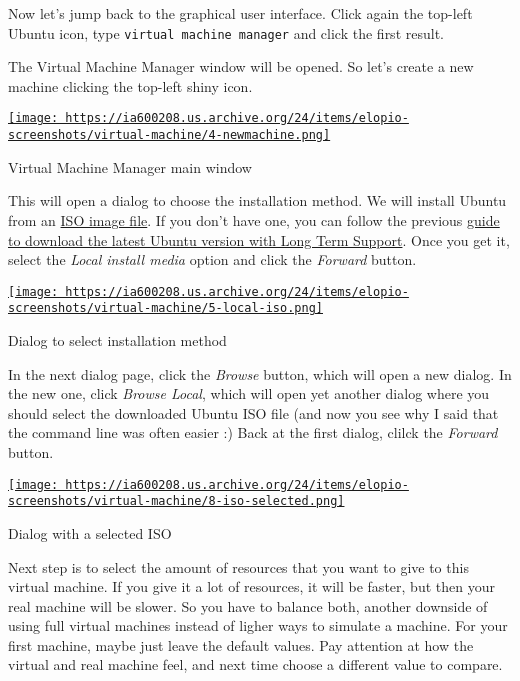 \documentclass[12pt]{article}
\begin{document}
Now let's jump back to the graphical user interface. Click again the top-left
Ubuntu icon, type \verb$virtual machine manager$ and click the first result.

The Virtual Machine Manager window will be opened. So let's create a new machine
clicking the top-left shiny icon.

\begin{center}
  \href{
    https://ia600208.us.archive.org/24/items/elopio-screenshots/virtual-machine/4-newmachine.png}{
    \texttt{[image: 
    https://ia600208.us.archive.org/24/items/elopio-screenshots/virtual-machine/4-newmachine.png]}
  }
  \caption{Virtual Machine Manager main window}
\end{center}

This will open a dialog to choose the installation method. We will install
Ubuntu from an
\href{https://en.wikipedia.org/wiki/ISO_image}{ISO image file}. If you don't
have one, you can follow the previous
\href{http://elopio.net/blog/download-ubuntu/}
     {guide to download the latest Ubuntu version with Long Term Support}.
Once you get it, select the \emph{Local install media} option and click the
\emph{Forward} button.

\begin{center}
  \href{
    https://ia600208.us.archive.org/24/items/elopio-screenshots/virtual-machine/5-local-iso.png}{
    \texttt{[image: 
    https://ia600208.us.archive.org/24/items/elopio-screenshots/virtual-machine/5-local-iso.png]}
  }
  \caption{Dialog to select installation method}
\end{center}

In the next dialog page, click the \emph{Browse} button, which will open a new
dialog. In the new one, click \emph{Browse Local}, which will open yet another
dialog where you should select the downloaded Ubuntu ISO file (and now you see
why I said that the command line was often easier :) Back at the first dialog,
clilck the \emph{Forward} button.

\begin{center}
  \href{
    https://ia600208.us.archive.org/24/items/elopio-screenshots/virtual-machine/8-iso-selected.png}{
    \texttt{[image: 
    https://ia600208.us.archive.org/24/items/elopio-screenshots/virtual-machine/8-iso-selected.png]}
  }
  \caption{Dialog with a selected ISO}
\end{center}

Next step is to select the amount of resources that you want to give to this
virtual machine. If you give it a lot of resources, it will be faster, but then
your real machine will be slower. So you have to balance both, another downside
of using full virtual machines instead of ligher ways to simulate a machine.
For your first machine, maybe just leave the default values. Pay attention at
how the virtual and real machine feel, and next time choose a different value
to compare.
\end{document}
